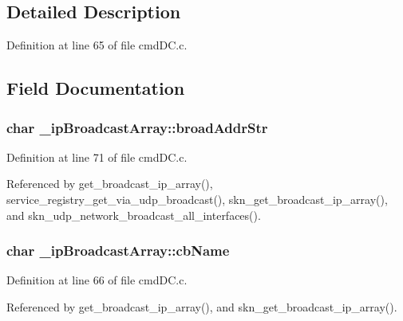 \subsection{Detailed Description}


Definition at line 65 of file cmd\+D\+C.\+c.



\subsection{Field Documentation}
\hypertarget{struct__ip_broadcast_array_af40943e174ba847fa0218cfa6051e277}{}
\subsubsection[{broad\+Addr\+Str}]{\setlength{\rightskip}{0pt plus 5cm}char \+\_\+ip\+Broadcast\+Array\+::broad\+Addr\+Str}\label{struct__ip_broadcast_array_af40943e174ba847fa0218cfa6051e277}


Definition at line 71 of file cmd\+D\+C.\+c.



Referenced by get\+\_\+broadcast\+\_\+ip\+\_\+array(), service\+\_\+registry\+\_\+get\+\_\+via\+\_\+udp\+\_\+broadcast(), skn\+\_\+get\+\_\+broadcast\+\_\+ip\+\_\+array(), and skn\+\_\+udp\+\_\+network\+\_\+broadcast\+\_\+all\+\_\+interfaces().

\hypertarget{struct__ip_broadcast_array_a0f592bd31dcc3ce00a349f04ff6bd1ba}{}
\subsubsection[{cb\+Name}]{\setlength{\rightskip}{0pt plus 5cm}char \+\_\+ip\+Broadcast\+Array\+::cb\+Name}\label{struct__ip_broadcast_array_a0f592bd31dcc3ce00a349f04ff6bd1ba}


Definition at line 66 of file cmd\+D\+C.\+c.



Referenced by get\+\_\+broadcast\+\_\+ip\+\_\+array(), and skn\+\_\+get\+\_\+broadcast\+\_\+ip\+\_\+array().

\hypertarget{struct__ip_broadcast_array_a06dab8742df19b5aec8538842617778d}{}
